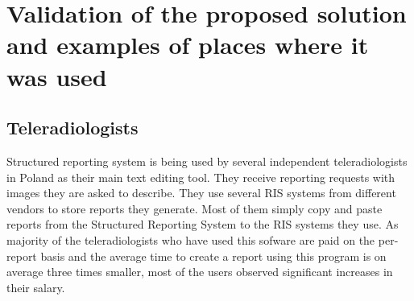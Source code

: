 \documentclass[12pt, twoside, openany]{report}
\theoremstyle{definition}
\begin{document}
\chapter{Validation of the proposed solution and examples of places where it was used}
\section{Teleradiologists}
Structured reporting system is being used by several independent teleradiologists in Poland as their main text editing tool. They receive reporting requests with images they are asked to describe. They use several RIS systems from different vendors to store reports they generate. Most of them simply copy and paste reports from the Structured Reporting System to the RIS systems they use. As majority of the teleradiologists who have used this sofware are paid on the per-report basis and the average time to create a report using this program is on average three times smaller, most of the users observed significant increases in their salary. 
\end{document}
